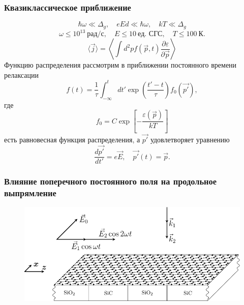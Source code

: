 \documentclass[10pt,pdf,intlimits]{beamer}
\newcommand{\pder}[2] {\frac{\partial #1}{\partial #2}}
\newcommand{\der}[2]  {\frac{d #1}{d #2}}
\newcommand{\eps}{\varepsilon}
\begin{document}
  \begin{frame}
  \frametitle{Квазиклассическое приближение}
  \begin{equation}
    \hbar\omega \ll \Delta_g,\quad eEd \ll \hbar\omega,\quad kT \ll \Delta_g      
  \end{equation}
  \begin{equation*}
      \omega \le 10^{13}~\text{рад}/\text{с},\quad E \le 10~\text{ед. СГС},\quad T\le100~\text{К}.
  \end{equation*}
  \begin{equation}
        \langle \vec{j} \rangle = \left\langle \int d^2 p  f(\vec{p}, t) \pder{\eps}{\vec{p}} \right\rangle
  \end{equation}
  Функцию распределения рассмотрим в приближении постоянного времени релаксации
  \begin{equation}
    f(t) = \frac{1}{\tau}\int_{-\infty}^{t} dt' \exp\left(\frac{t'-t}{\tau}\right) f_0(\vec{p'}),
  \end{equation}
  где
  \begin{equation}
    f_0 = C\exp\left[-\frac{\eps(\vec{p})}{kT}\right]
  \end{equation}
  есть равновесная функция распределения, а \( \vec{p'} \) удовлетворяет уравнению
  \begin{equation}
    \der{\vec{p'}}{t'} = e\vec{E},\quad \vec{p'}(t) = \vec{p}.
  \end{equation}
  \end{frame}
  \begin{frame}
  \frametitle{Влияние поперечного постоянного поля на продольное выпрямление}
        \begin{figure}[h]
          \center
          \includegraphics[height=.6\textheight]{../figures/graphene1.pdf}
      \end{figure}
  \end{frame}
\end{document}
